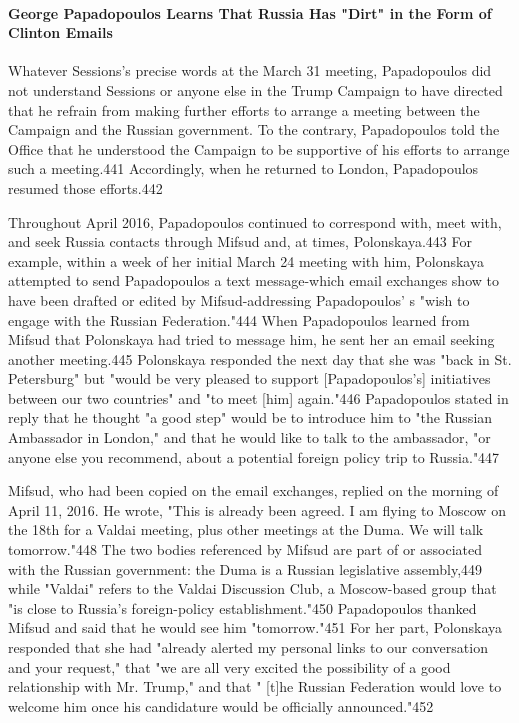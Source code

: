 \paragraph{George Papadopoulos Learns That Russia Has "Dirt" in the Form of Clinton Emails}

Whatever Sessions's precise words at the March 31 meeting,  Papadopoulos did not understand Sessions or anyone else in the Trump Campaign to have directed that he refrain from making further efforts to arrange a  meeting between the Campaign and the Russian government. To the contrary, Papadopoulos told the Office that he understood the Campaign to be supportive of his efforts to arrange such a meeting.441 Accordingly,   when he returned to London, Papadopoulos resumed those efforts.442

Throughout April 2016, Papadopoulos continued to correspond with, meet with, and seek Russia contacts through Mifsud and, at times, Polonskaya.443 For example, within a  week of her initial March 24 meeting with him, Polonskaya attempted to send Papadopoulos a text message-which email exchanges show to have been drafted or edited by Mifsud-addressing Papadopoulos' s  "wish to engage with the Russian Federation."444 When Papadopoulos learned from Mifsud that Polonskaya had tried to message him,  he sent her an email seeking another meeting.445 Polonskaya responded the next day that she was "back in St. Petersburg"  but "would be very pleased to support [Papadopoulos's] initiatives between our two countries"  and "to meet [him] again."446 Papadopoulos stated in reply that he thought "a good step" would be to introduce him to "the Russian Ambassador in London," and that he would like to talk to the ambassador, "or anyone else you recommend, about a potential foreign policy trip to Russia."447

Mifsud, who had been copied on the email exchanges, replied on the morning of April 11, 2016. He wrote, "This is already been agreed. I  am flying to Moscow on the 18th for a  Valdai meeting, plus other meetings at the Duma. We will talk tomorrow."448 The two bodies referenced by Mifsud are part of or associated with the Russian government: the Duma is a Russian legislative assembly,449 while "Valdai" refers to the Valdai Discussion Club, a Moscow-based group that "is close to Russia's foreign-policy establishment."450 Papadopoulos thanked Mifsud and said that he would see him "tomorrow."451 For her part, Polonskaya responded that she had "already alerted my personal links to our conversation and your request," that "we  are all very excited the possibility of a good relationship with Mr. Trump," and that " [t]he Russian Federation would love to welcome him once his candidature would be officially announced."452

